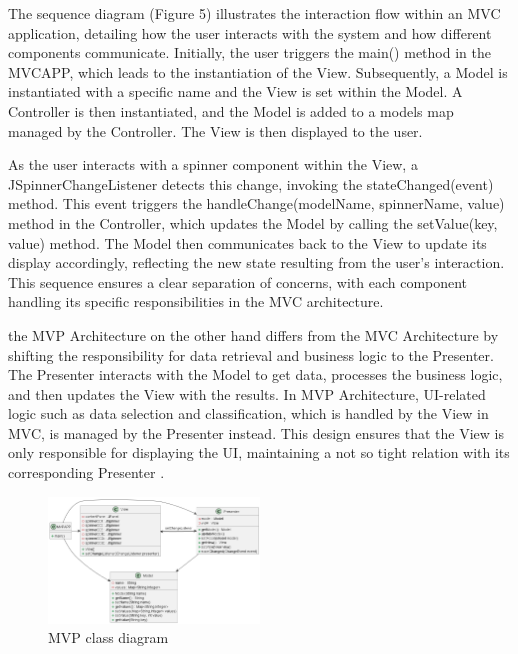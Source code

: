 \documentclass[conference]{IEEEtran}
\begin{document}
The sequence diagram (Figure 5) illustrates the interaction flow within an MVC application, detailing how the user interacts with the system and how different components communicate. Initially, the user triggers the main() method in the MVCAPP, which leads to the instantiation of the View. Subsequently, a Model is instantiated with a specific name and the View is set within the Model. A Controller is then instantiated, and the Model is added to a models map managed by the Controller. The View is then displayed to the user.

As the user interacts with a spinner component within the View, a JSpinnerChangeListener detects this change, invoking the stateChanged(event) method. This event triggers the handleChange(modelName, spinnerName, value) method in the Controller, which updates the Model by calling the setValue(key, value) method. The Model then communicates back to the View to update its display accordingly, reflecting the new state resulting from the user's interaction. This sequence ensures a clear separation of concerns, with each component handling its specific responsibilities in the MVC architecture.

the MVP Architecture on the other hand differs from the MVC Architecture by shifting the responsibility for data retrieval and business logic to the Presenter. The Presenter interacts with the Model to get data, processes the business logic, and then updates the View with the results. In MVP Architecture, UI-related logic such as data selection and classification, which is handled by the View in MVC, is managed by the Presenter instead. This design ensures that the View is only responsible for displaying the UI, maintaining a not so tight relation with its corresponding Presenter \cite{c7}.

\begin{figure}
    [h]
    \centering
    \includegraphics[width = 0.5\textwidth]{Image/mvp_class_diagram.png}
    \caption{MVP class diagram}
    \label{fig:enter-label}
\end{figure}
\end{document}
